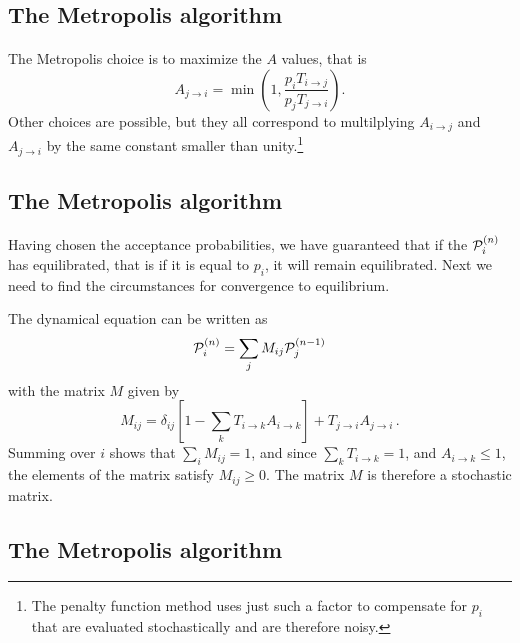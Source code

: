 \documentclass[%
twoside,                 %
final,                   %
10pt]{article}
\begin{document}
\subsection*{The Metropolis algorithm}

\paragraph{}
The Metropolis choice is to maximize the $A$ values, that is
\[
A_{j \rightarrow i} = \min \left ( 1,
\frac{p_iT_{i\rightarrow j}}{ p_jT_{j\rightarrow i}}\right ).
\]
Other choices are possible, but they all correspond to multilplying
$A_{i\rightarrow j}$ and $A_{j\rightarrow i}$ by the same constant
smaller than unity.\footnote{The penalty function method uses just such
a factor to compensate for $p_i$ that are evaluated stochastically
and are therefore noisy.}



\subsection*{The Metropolis algorithm}

\paragraph{}
Having chosen the acceptance probabilities, we have guaranteed that
if the  ${\cal P}_i^{(n)}$ has equilibrated, that is if it is equal to $p_i$,
it will remain equilibrated. Next we need to find the circumstances for
convergence to equilibrium.

The dynamical equation can be written as
\[
{\cal P}^{(n)}_i = \sum_j M_{ij}{\cal P}^{(n-1)}_j
\]
with the matrix $M$ given by
\[
M_{ij} = \delta_{ij}\left [ 1 -\sum_k T_{i\rightarrow k} A_{i \rightarrow k}
\right ] + T_{j\rightarrow i} A_{j\rightarrow i} \,.
\]
Summing over $i$ shows that $\sum_i M_{ij} = 1$, and since
$\sum_k T_{i\rightarrow k} = 1$, and $A_{i \rightarrow k} \leq 1$, the
elements of the matrix satisfy $M_{ij} \geq 0$. The matrix $M$ is therefore
a stochastic matrix.




\subsection*{The Metropolis algorithm}
\end{document}
